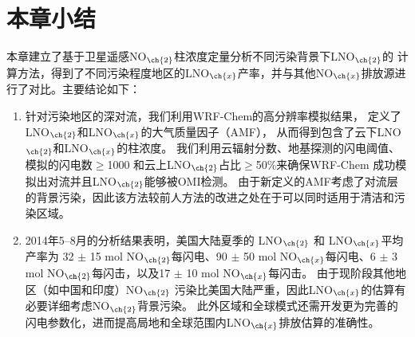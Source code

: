 \section{本章小结}

本章建立了基于卫星遥感NO$_{\ch{2}}$柱浓度定量分析不同污染背景下LNO$_{\ch{2}}$的
计算方法，得到了不同污染程度地区的LNO$_{\ch{x}}$产率，并与其他NO$_{\ch{x}}$排放源进行了对比。主要结论如下：

\begin{enumerate}[label=（\arabic*）, labelindent=\parindent, nosep, leftmargin=0pt, widest=0, itemindent=*, topsep=0pt, partopsep=0pt, parsep=0pt]

\item 针对污染地区的深对流，我们利用WRF-Chem的高分辨率模拟结果，
定义了LNO$_{\ch{2}}$和LNO$_{\ch{x}}$的大气质量因子（AMF），
从而得到包含了云下LNO$_{\ch{2}}$和LNO$_{\ch{x}}$的柱浓度。
我们利用云辐射分数、地基探测的闪电阈值、模拟的闪电数$\geq$1000 和云上LNO$_{\ch{2}}$占比$\geq$50\%来确保WRF-Chem 成功模拟出对流并且LNO$_{\ch{2}}$能够被OMI检测。
由于新定义的AMF考虑了对流层的背景污染，因此该方法较前人方法的改进之处在于可以同时适用于清洁和污染区域。

\item 2014年5--8月的分析结果表明，美国大陆夏季的 LNO$_{\ch{2}}$ 和 LNO$_{\ch{x}}$平均产率为
32 $\pm$ 15 mol NO$_{\ch{2}}$每闪电、90 $\pm$ 50 mol NO$_{\ch{x}}$每闪电、6 $\pm$ 3 mol NO$_{\ch{2}}$每闪击，以及17 $\pm$ 10 mol NO$_{\ch{x}}$每闪击。
由于现阶段其他地区（如中国和印度）NO$_{\ch{2}}$ 污染比美国大陆严重，因此LNO$_{\ch{x}}$的估算有必要详细考虑NO$_{\ch{2}}$背景污染。
此外区域和全球模式还需开发更为完善的闪电参数化，进而提高局地和全球范围内LNO$_{\ch{x}}$排放估算的准确性。

\end{enumerate}
